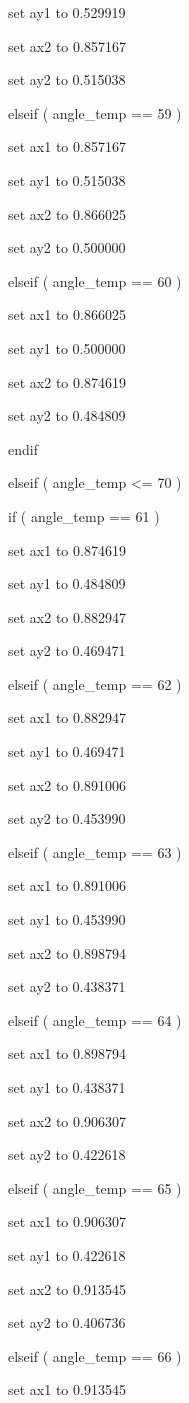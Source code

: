 \documentclass[
]{article}
\begin{document}
set ay1 to 0.529919

set ax2 to 0.857167

set ay2 to 0.515038

elseif ( angle\_temp == 59 )

set ax1 to 0.857167

set ay1 to 0.515038

set ax2 to 0.866025

set ay2 to 0.500000

elseif ( angle\_temp == 60 )

set ax1 to 0.866025

set ay1 to 0.500000

set ax2 to 0.874619

set ay2 to 0.484809

endif

elseif ( angle\_temp \textless= 70 )

if ( angle\_temp == 61 )

set ax1 to 0.874619

set ay1 to 0.484809

set ax2 to 0.882947

set ay2 to 0.469471

elseif ( angle\_temp == 62 )

set ax1 to 0.882947

set ay1 to 0.469471

set ax2 to 0.891006

set ay2 to 0.453990

elseif ( angle\_temp == 63 )

set ax1 to 0.891006

set ay1 to 0.453990

set ax2 to 0.898794

set ay2 to 0.438371

elseif ( angle\_temp == 64 )

set ax1 to 0.898794

set ay1 to 0.438371

set ax2 to 0.906307

set ay2 to 0.422618

elseif ( angle\_temp == 65 )

set ax1 to 0.906307

set ay1 to 0.422618

set ax2 to 0.913545

set ay2 to 0.406736

elseif ( angle\_temp == 66 )

set ax1 to 0.913545
\end{document}

